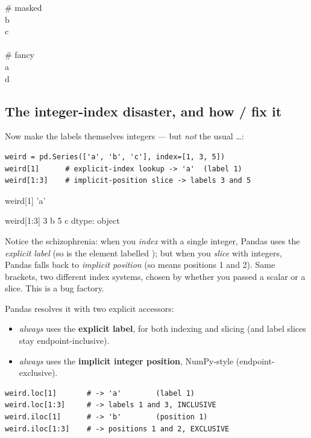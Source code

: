 \documentclass[11pt]{article}
\begin{document}
\begin{outbox}
\# masked \\
b  \\
c  \\
\\
\# fancy \\
a  \\
d 
\end{outbox}

\subsection{The integer-index disaster, and how / fix it}

Now make the labels themselves integers --- but \emph{not} the usual \dots:

\begin{lstlisting}
weird = pd.Series(['a', 'b', 'c'], index=[1, 3, 5])
weird[1]      # explicit-index lookup -> 'a'  (label 1)
weird[1:3]    # implicit-position slice -> labels 3 and 5
\end{lstlisting}

\begin{outblock}
weird[1]
'a'

weird[1:3]
3    b
5    c
dtype: object
\end{outblock}

Notice the schizophrenia: when you \emph{index} with a single integer, Pandas uses the \emph{explicit label} (so  is the element labelled ); but when you \emph{slice} with integers, Pandas falls back to \emph{implicit position} (so  means positions 1 and 2). Same brackets, two different index systems, chosen by whether you passed a scalar or a slice. This is a bug factory.

Pandas resolves it with two explicit accessors:

\begin{itemize}
  \item {} \emph{always} uses the \textbf{explicit label}, for both indexing and slicing (and label slices stay endpoint-inclusive).
  \item {} \emph{always} uses the \textbf{implicit integer position}, NumPy-style (endpoint-exclusive).
\end{itemize}

\begin{lstlisting}
weird.loc[1]       # -> 'a'        (label 1)
weird.loc[1:3]     # -> labels 1 and 3, INCLUSIVE
weird.iloc[1]      # -> 'b'        (position 1)
weird.iloc[1:3]    # -> positions 1 and 2, EXCLUSIVE
\end{lstlisting}
\end{document}
